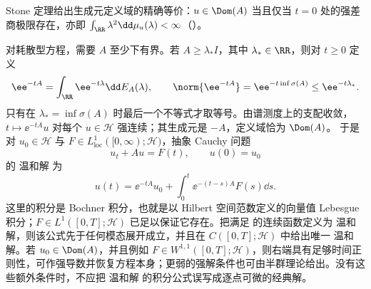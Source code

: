 Stone 定理给出生成元定义域的精确等价：$u\in\Dom(A)$ 当且仅当 $t=0$ 处的强差商极限存在，亦即 $\int_{\RR}\lambda^2\dd\mu_u(\lambda)<\infty$（）。

对耗散型方程，需要 $A$ 至少下有界。若 $A\ge \lambda_* I$，其中 $\lambda_*\in\RR$，则对 $t\ge0$ 定义
\[
 \ee^{-tA}=\int_{\RR}\ee^{-t\lambda}\dd E_A(\lambda),
 \qquad
 \norm{\ee^{-tA}}
 =\ee^{-t\inf\sigma(A)}\le\ee^{-t\lambda_*}.
\]
只有在 $\lambda_*=\inf\sigma(A)$ 时最后一个不等式才取等号。由谱测度上的支配收敛，$t\mapsto\ee^{-tA}u$ 对每个 $u\in\mathcal H$ 强连续；其生成元是 $-A$，定义域恰为 $\Dom(A)$。
于是对 $u_0\in\mathcal H$ 与
$F\in L^1_{\mathrm{loc}}([0,\infty);\mathcal H)$，抽象 Cauchy 问题
\begin{equation}\label{eq:math-sl-first-order-abstract}
 u_t+Au=F(t),\qquad u(0)=u_0
\end{equation}
的 温和解 为
\begin{equation}\label{eq:math-sl-duhamel-semigroup}
 u(t)=\ee^{-tA}u_0+
 \int_0^t\ee^{-(t-s)A}F(s)\dd s.
\end{equation}
这里的积分是 Bochner 积分，也就是以 Hilbert 空间范数定义的向量值 Lebesgue 积分；$F\in L^1([0,T];\mathcal H)$ 已足以保证它存在。把满足 的连续函数定义为 温和解，则该公式先于任何模态展开成立，并且在 $C([0,T];\mathcal H)$ 中给出唯一 温和解。若 $u_0\in\Dom(A)$，并且例如 $F\in W^{1,1}([0,T];\mathcal H)$，则右端具有足够时间正则性，可作强导数并恢复方程本身；更弱的强解条件也可由半群理论给出。没有这些额外条件时，不应把 温和解 的积分公式误写成逐点可微的经典解。


